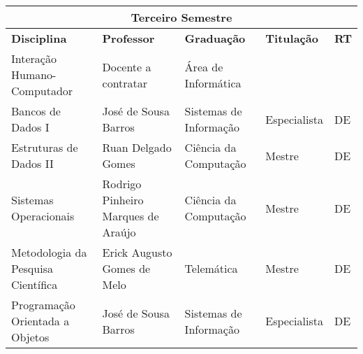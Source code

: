 \begin{table}[h!]
\scriptsize
\begin{tabular}{lllll}
\multicolumn{5}{c}{\cellcolor[HTML]{C0C0C0}\textbf{Terceiro Semestre}}                                                                                                                                                                                                                                    \\ \hline
\multicolumn{1}{|p{5.2cm}|}{\cellcolor[HTML]{FFFFFF}\textbf{Disciplina}}                                    & \multicolumn{1}{p{5.2cm}|}{\textbf{Professor}}                 & \multicolumn{1}{p{3.1cm}|}{\textbf{Graduação}}     & \multicolumn{1}{p{1.7cm}|}{\textbf{Titulação}} & \multicolumn{1}{p{0.6cm}|}{\textbf{RT}} \\ \hline
\multicolumn{1}{|l|}{Intera\c{c}\~ao Humano-Computador}                                                            & \multicolumn{1}{l|}{Docente a contratar}             & \multicolumn{1}{l|}{\'Area de Inform\'atica}          & \multicolumn{1}{l|}{}             & \multicolumn{1}{l|}{}                          \\ \hline
\multicolumn{1}{|l|}{Bancos de Dados I} & \multicolumn{1}{l|}{Jos\'e de Sousa Barros}        & \multicolumn{1}{l|}{Sistemas de Informa\c{c}\~ao}             & \multicolumn{1}{l|}{Especialista}             & \multicolumn{1}{l|}{DE}                          \\ \hline
\multicolumn{1}{|l|}{\cellcolor[HTML]{FFFFFF}Estruturas de Dados II}                         & \multicolumn{1}{l|}{Ruan Delgado Gomes}   & \multicolumn{1}{l|}{Ci\^encia da Computa\c{c}\~ao}             & \multicolumn{1}{l|}{Mestre}             & \multicolumn{1}{l|}{DE}                        \\ \hline
\multicolumn{1}{|l|}{Sistemas Operacionais}                                             & \multicolumn{1}{l|}{Rodrigo Pinheiro Marques de Ara\'ujo}                 & \multicolumn{1}{l|}{Ci\^encia da Computa\c{c}\~ao}  & \multicolumn{1}{l|}{Mestre}             & \multicolumn{1}{l|}{DE}                          \\ \hline
\multicolumn{1}{|l|}{Metodologia da Pesquisa Cient\'ifica}                                                      & \multicolumn{1}{l|}{Erick Augusto Gomes de Melo} & \multicolumn{1}{l|}{Telem\'atica}  & \multicolumn{1}{l|}{Mestre}             & \multicolumn{1}{l|}{DE}                          \\ \hline
\multicolumn{1}{|l|}{Programa\c{c}\~ao Orientada a Objetos}                                                         & \multicolumn{1}{l|}{Jos\'e de Sousa Barros}       & \multicolumn{1}{l|}{Sistemas de Informa\c{c}\~ao} & \multicolumn{1}{l|}{Especialista}       & \multicolumn{1}{l|}{DE}                        \\ \hline
\end{tabular}
\end{table}

